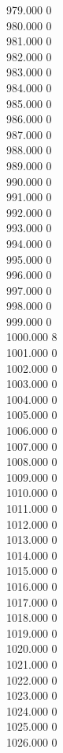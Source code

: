 { 979.000	0 \\
 980.000	0 \\
 981.000	0 \\
 982.000	0 \\
 983.000	0 \\
 984.000	0 \\
 985.000	0 \\
 986.000	0 \\
 987.000	0 \\
 988.000	0 \\
 989.000	0 \\
 990.000	0 \\
 991.000	0 \\
 992.000	0 \\
 993.000	0 \\
 994.000	0 \\
 995.000	0 \\
 996.000	0 \\
 997.000	0 \\
 998.000	0 \\
 999.000	0 \\
 1000.000	8 \\
 1001.000	0 \\
 1002.000	0 \\
 1003.000	0 \\
 1004.000	0 \\
 1005.000	0 \\
 1006.000	0 \\
 1007.000	0 \\
 1008.000	0 \\
 1009.000	0 \\
 1010.000	0 \\
 1011.000	0 \\
 1012.000	0 \\
 1013.000	0 \\
 1014.000	0 \\
 1015.000	0 \\
 1016.000	0 \\
 1017.000	0 \\
 1018.000	0 \\
 1019.000	0 \\
 1020.000	0 \\
 1021.000	0 \\
 1022.000	0 \\
 1023.000	0 \\
 1024.000	0 \\
 1025.000	0 \\
 1026.000	0 \\
}
